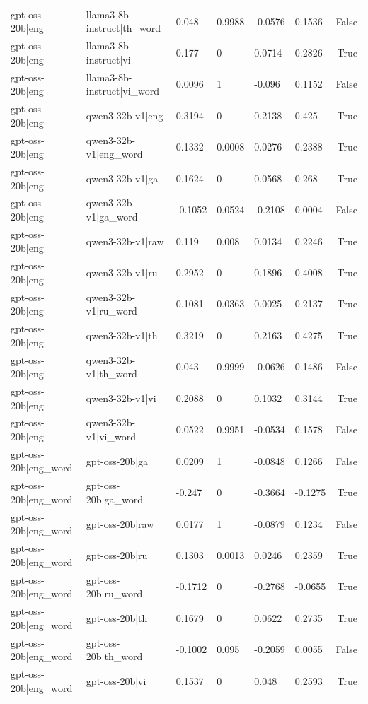 \begin{table}
\begin{tabular}{llllllr}
gpt-oss-20b|eng & llama3-8b-instruct|th_word & 0.048 & 0.9988 & -0.0576 & 0.1536 & False \\
gpt-oss-20b|eng & llama3-8b-instruct|vi & 0.177 & 0 & 0.0714 & 0.2826 & True \\
gpt-oss-20b|eng & llama3-8b-instruct|vi_word & 0.0096 & 1 & -0.096 & 0.1152 & False \\
gpt-oss-20b|eng & qwen3-32b-v1|eng & 0.3194 & 0 & 0.2138 & 0.425 & True \\
gpt-oss-20b|eng & qwen3-32b-v1|eng_word & 0.1332 & 0.0008 & 0.0276 & 0.2388 & True \\
gpt-oss-20b|eng & qwen3-32b-v1|ga & 0.1624 & 0 & 0.0568 & 0.268 & True \\
gpt-oss-20b|eng & qwen3-32b-v1|ga_word & -0.1052 & 0.0524 & -0.2108 & 0.0004 & False \\
gpt-oss-20b|eng & qwen3-32b-v1|raw & 0.119 & 0.008 & 0.0134 & 0.2246 & True \\
gpt-oss-20b|eng & qwen3-32b-v1|ru & 0.2952 & 0 & 0.1896 & 0.4008 & True \\
gpt-oss-20b|eng & qwen3-32b-v1|ru_word & 0.1081 & 0.0363 & 0.0025 & 0.2137 & True \\
gpt-oss-20b|eng & qwen3-32b-v1|th & 0.3219 & 0 & 0.2163 & 0.4275 & True \\
gpt-oss-20b|eng & qwen3-32b-v1|th_word & 0.043 & 0.9999 & -0.0626 & 0.1486 & False \\
gpt-oss-20b|eng & qwen3-32b-v1|vi & 0.2088 & 0 & 0.1032 & 0.3144 & True \\
gpt-oss-20b|eng & qwen3-32b-v1|vi_word & 0.0522 & 0.9951 & -0.0534 & 0.1578 & False \\
gpt-oss-20b|eng_word & gpt-oss-20b|ga & 0.0209 & 1 & -0.0848 & 0.1266 & False \\
gpt-oss-20b|eng_word & gpt-oss-20b|ga_word & -0.247 & 0 & -0.3664 & -0.1275 & True \\
gpt-oss-20b|eng_word & gpt-oss-20b|raw & 0.0177 & 1 & -0.0879 & 0.1234 & False \\
gpt-oss-20b|eng_word & gpt-oss-20b|ru & 0.1303 & 0.0013 & 0.0246 & 0.2359 & True \\
gpt-oss-20b|eng_word & gpt-oss-20b|ru_word & -0.1712 & 0 & -0.2768 & -0.0655 & True \\
gpt-oss-20b|eng_word & gpt-oss-20b|th & 0.1679 & 0 & 0.0622 & 0.2735 & True \\
gpt-oss-20b|eng_word & gpt-oss-20b|th_word & -0.1002 & 0.095 & -0.2059 & 0.0055 & False \\
gpt-oss-20b|eng_word & gpt-oss-20b|vi & 0.1537 & 0 & 0.048 & 0.2593 & True \\

\end{tabular}
\end{table}
